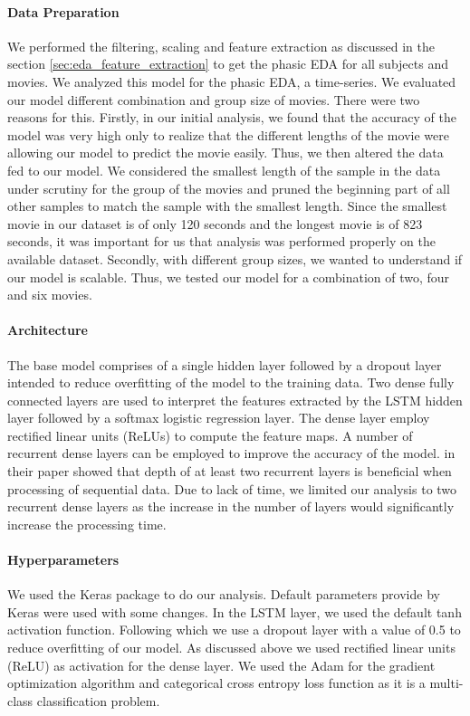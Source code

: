 \paragraph{Data Preparation}

We performed the filtering, scaling and feature extraction as discussed in the section \ref{sec:eda_feature_extraction} to get the phasic EDA for all subjects and movies. We analyzed this model for the phasic EDA, a time-series. We evaluated our model different combination and group size of movies. There were two reasons for this. Firstly, in our initial analysis, we found that the accuracy of the model was very high only to realize that the different lengths of the movie were allowing our model to predict the movie easily. Thus, we then altered the data fed to our model. We considered the smallest length of the sample in the data under scrutiny for the group of the movies and pruned the beginning part of all other samples to match the sample with the smallest length. Since the smallest movie in our dataset is of only 120 seconds and the longest movie is of 823 seconds, it was important for us that analysis was performed properly on the available dataset. Secondly, with different group sizes, we wanted to understand if our model is scalable. Thus, we tested our model for a combination of two, four and six movies. 

\paragraph{Architecture} The base model comprises of a single hidden layer followed by a dropout layer intended to reduce overfitting of the model to the training data. Two dense fully connected layers are used to interpret the features extracted by the LSTM hidden layer followed by a softmax logistic regression layer. The dense layer employ rectified linear units (ReLUs) to compute the feature maps. A number of recurrent dense layers can be employed to improve the accuracy of the model. \citeauthor{karpathy_visualizing_2015} in their paper showed that depth of at least two recurrent layers is beneficial when processing of sequential data. Due to lack of time, we limited our analysis to two recurrent dense layers as the increase in the number of layers would significantly increase the processing time. 

\paragraph{Hyperparameters} We used the Keras \cite{keras} package to do our analysis. Default parameters provide by Keras were used with some changes. In the LSTM layer, we used the default tanh activation function. Following which we use a dropout layer with a value of 0.5 to reduce overfitting of our model. As discussed above we used rectified linear units (ReLU) as activation for the dense layer. We used the Adam for the gradient optimization algorithm \cite{kingma_adam:_2014} and categorical cross entropy loss function as it is a multi-class classification problem. 

